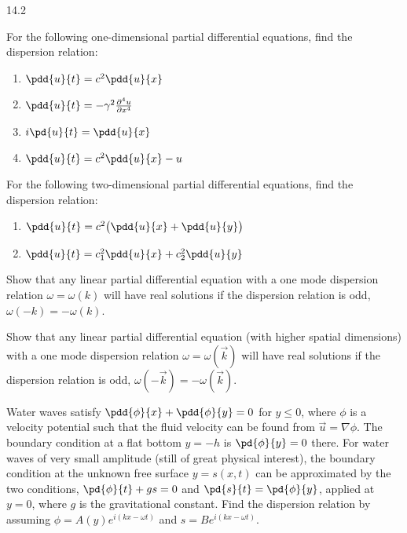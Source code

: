 \begin{exercises}{14.2}
\item For the following one-dimensional partial differential equations, find the dispersion relation:
\begin{enumerate}
\item[(a)] $\pdd{u}{t} = c^2\pdd{u}{x}$
\item[(b)] $\pdd{u}{t} = -\gamma^2\frac{\partial^4 u}{\partial x^4}$
\item[\starred (c)] $i\pd{u}{t} = \pdd{u}{x}$
\item[(d)] $\pdd{u}{t} = c^2\pdd{u}{x} - u$
\end{enumerate}

\item For the following two-dimensional partial differential equations, find the dispersion relation:
\begin{enumerate}
\item[(a)] $\pdd{u}{t} = c^2\bigl(\pdd{u}{x} + \pdd{u}{y}\bigr)$
\item[(b)] $\pdd{u}{t} = c_1^2\pdd{u}{x} + c_2^2\pdd{u}{y}$
\end{enumerate}

\item Show that any linear partial differential equation with a one mode dispersion relation $\omega = \omega(k)$ will have real solutions if the dispersion relation is odd, $\omega(-k) = -\omega(k)$.

\item Show that any linear partial differential equation (with higher spatial dimensions) with a one mode dispersion relation $\omega = \omega(\vec{k})$ will have real solutions if the dispersion relation is odd, $\omega(-\vec{k}) = -\omega(\vec{k})$.

\item[\starred] Water waves satisfy $\pdd{\phi}{x} + \pdd{\phi}{y} = 0$ for $y \le 0$, where $\phi$ is a velocity potential such that the fluid velocity can be found from $\vec{u} = \nabla\phi$.  The boundary condition at a flat bottom $y = -h$ is $\pd{\phi}{y} = 0$ there.  For water waves of very small amplitude (still of great physical interest), the boundary condition at the unknown free surface $y = s(x,t)$ can be approximated by the two conditions, $\pd{\phi}{t} + gs = 0$ and $\pd{s}{t} = \pd{\phi}{y}$, applied at $y = 0$, where $g$ is the gravitational constant.  Find the dispersion relation by assuming $\phi = A(y)e^{i(kx - \omega t)}$ and $s = Be^{i(kx - \omega t)}$.


\end{exercises}
